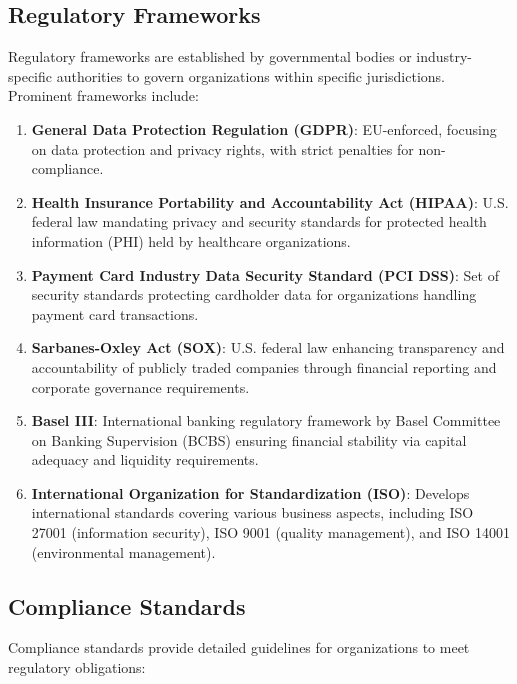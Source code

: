 \documentclass[conference]{IEEEtran}
\begin{document}
\subsection{Regulatory Frameworks}
Regulatory frameworks are established by governmental bodies or industry-specific authorities to govern organizations within specific jurisdictions. Prominent frameworks include:

\begin{enumerate}

    \item \textbf{General Data Protection Regulation (GDPR)}: EU-enforced, focusing on data protection and privacy rights, with strict penalties for non-compliance.

    \item \textbf{Health Insurance Portability and Accountability Act (HIPAA)}: U.S. federal law mandating privacy and security standards for protected health information (PHI) held by healthcare organizations.

    \item \textbf{Payment Card Industry Data Security Standard (PCI DSS)}: Set of security standards protecting cardholder data for organizations handling payment card transactions.

    \item \textbf{Sarbanes-Oxley Act (SOX)}: U.S. federal law enhancing transparency and accountability of publicly traded companies through financial reporting and corporate governance requirements.

    \item \textbf{Basel III}: International banking regulatory framework by Basel Committee on Banking Supervision (BCBS) ensuring financial stability via capital adequacy and liquidity requirements.

    \item \textbf{International Organization for Standardization (ISO)}: Develops international standards covering various business aspects, including ISO 27001 (information security), ISO 9001 (quality management), and ISO 14001 (environmental management).

\end{enumerate}

\subsection{Compliance Standards}

Compliance standards provide detailed guidelines for organizations to meet regulatory obligations:
\end{document}
